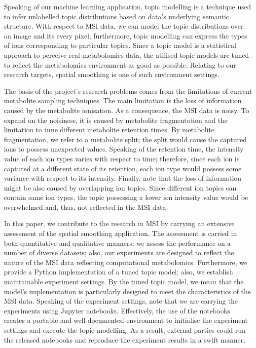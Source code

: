 \documentclass{mpaper}
\begin{document}
\par Speaking of our machine learning application, topic modelling is a technique used to infer unlabelled topic distributions based on data's underlying semantic structure. With respect to MSI data, we can model the topic distributions over an image and its every pixel; furthermore, topic modelling can express the types of ions corresponding to particular topics. Since a topic model is a statistical approach to perceive real metabolomics data, the utilised topic models are tuned to reflect the metabolomics environment as good as possible. Relating to our research targets, spatial smoothing is one of such environment settings.

\par The basis of the project's research problems comes from the limitations of current metabolite sampling techniques. The main limitation is the loss of information caused by the metabolite ionisation. As a consequence, the MSI data is noisy. To expand on the noisiness, it is caused by metabolite fragmentation and the limitation to tune different metabolite retention times. By metabolite fragmentation, we refer to a metabolite split; the split would cause the captured ions to possess unexpected values. Speaking of the retention time, the intensity value of each ion types varies with respect to time; therefore, since each ion is captured at a different state of its retention, each ion type would possess some variance with respect to its intensity. Finally, note that the loss of information might be also caused by overlapping ion topics. Since different ion topics can contain same ion types, the topic possessing a lower ion intensity value would be overwhelmed and, thus, not reflected in the MSI data.
\par In this paper, we contribute to the research in MSI by carrying an extensive assessment of the spatial smoothing application. The assessment is carried in both quantitative and qualitative manners: we assess the performance on a number of diverse datasets; also, our experiments are designed to reflect the nature of the MSI data reflecting computational metabolomics. Furthermore, we provide a Python implementation of a tuned topic model; also, we establish maintainable experiment settings. By the tuned topic model, we mean that the model's implementation is particularly designed to meet the characteristics of the MSI data. Speaking of the experiment settings, note that we are carrying the experiments using Jupyter notebooks. Effectively, the use of the notebooks creates a portable and well-documented environment to initialise the experiment settings and execute the topic modelling. As a result, external parties could run the released notebooks and reproduce the experiment results in a swift manner.
\end{document}
